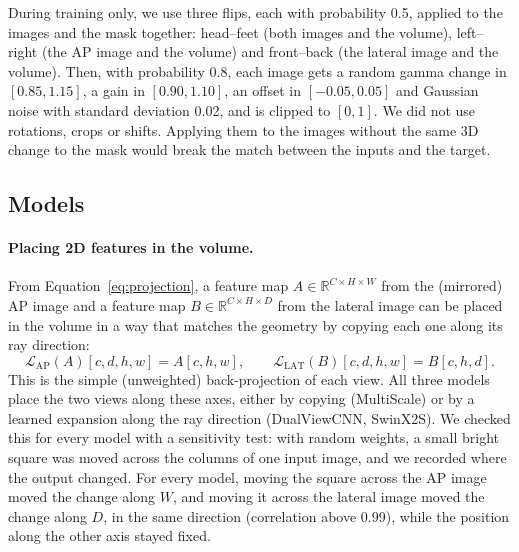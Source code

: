 \documentclass[11pt]{article}
\newcommand{\AP}{\mathrm{AP}}
\newcommand{\LAT}{\mathrm{LAT}}
\begin{document}
During training only, we use three flips, each with probability 0.5, applied to the images and the mask together: head--feet (both images and the volume), left--right (the AP image and the volume) and front--back (the lateral image and the volume). Then, with probability 0.8, each image gets a random gamma change in $[0.85,1.15]$, a gain in $[0.90,1.10]$, an offset in $[-0.05,0.05]$ and Gaussian noise with standard deviation 0.02, and is clipped to $[0,1]$. We did not use rotations, crops or shifts. Applying them to the images without the same 3D change to the mask would break the match between the inputs and the target.

\subsection{Models}\label{sec:models}

\paragraph{Placing 2D features in the volume.}
From Equation~\eqref{eq:projection}, a feature map $A\in\mathbb{R}^{C\times H\times W}$ from the (mirrored) AP image and a feature map $B\in\mathbb{R}^{C\times H\times D}$ from the lateral image can be placed in the volume in a way that matches the geometry by copying each one along its ray direction:
\begin{equation}
\mathcal{L}_\AP(A)[c,d,h,w]=A[c,h,w],\qquad \mathcal{L}_\LAT(B)[c,d,h,w]=B[c,h,d].
\label{eq:lifting}
\end{equation}
This is the simple (unweighted) back-projection of each view. All three models place the two views along these axes, either by copying (MultiScale) or by a learned expansion along the ray direction (DualViewCNN, SwinX2S). We checked this for every model with a sensitivity test: with random weights, a small bright square was moved across the columns of one input image, and we recorded where the output changed. For every model, moving the square across the AP image moved the change along $W$, and moving it across the lateral image moved the change along $D$, in the same direction (correlation above 0.99), while the position along the other axis stayed fixed.
\end{document}
